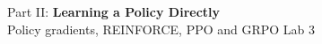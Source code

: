 \begin{frame}{}
    \LARGE Part II: \textbf{Learning a Policy Directly}\\[0.8em]
    \normalsize Policy gradients, REINFORCE, PPO and GRPO \hfill Lab 3
\end{frame}

